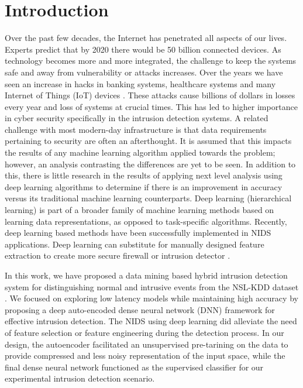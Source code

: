 \documentclass[runningheads]{llncs}
\begin{document}






{\section{Introduction} \label{sec:introduction}}
Over the past few decades, the Internet has penetrated all aspects of our lives. Experts
predict that by 2020 there would be 50 billion connected devices. As technology
becomes more and more integrated, the challenge to keep the systems safe and away
from vulnerability or attacks increases. Over the years we have seen an increase in hacks
in banking systems, healthcare systems and many Internet of Things (IoT) devices \cite{Shone2018}.
These attacks cause billions of dollars in losses every year and loss of systems at crucial times. This has led to higher importance in cyber security specifically in the intrusion detection systems. A related challenge with most modern-day infrastructure is that data requirements pertaining to security are often an afterthought. It is assumed that this impacts the results of any machine learning algorithm applied towards the problem; however, an analysis contrasting the differences are yet to be seen. In addition to this, there is little research in the results of applying next level analysis using deep learning algorithms to determine if there is an improvement in accuracy versus its traditional machine learning counterparts. Deep learning (hierarchical learning) is part of a broader family of machine learning methods based on learning data representations, as opposed to task-specific algorithms. Recently, deep learning
based methods have been successfully implemented in NIDS applications. Deep learning can substitute for manually designed feature extraction to create more secure firewall or intrusion detector \cite{ref:survey18}.

 In this work, we have proposed a data mining based hybrid intrusion detection system for distinguishing normal and intrusive events from the NSL-KDD dataset \cite{NSLKDD}.
We focused on exploring low latency models  while  maintaining  high  accuracy  by  proposing a deep auto-encoded dense neural network (DNN) framework for effective intrusion detection. The NIDS using deep learning did alleviate the need of feature selection or feature engineering during the detection process.  In our design, the autoencoder facilitated an unsupervised pre-tarining on the data to provide compressed and less noisy representation of the input space, while the final dense neural network functioned as the supervised classifier for our experimental intrusion detection scenario.
\end{document}
